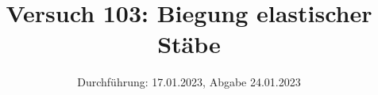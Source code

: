

\title{Versuch 103: Biegung elastischer Stäbe}
\date{Durchführung: 17.01.2023, Abgabe 24.01.2023}


\maketitle
\thispagestyle{empty} 
\tableofcontents
\newpage
\setcounter{page}{1}






\printbibliography
\newpage



